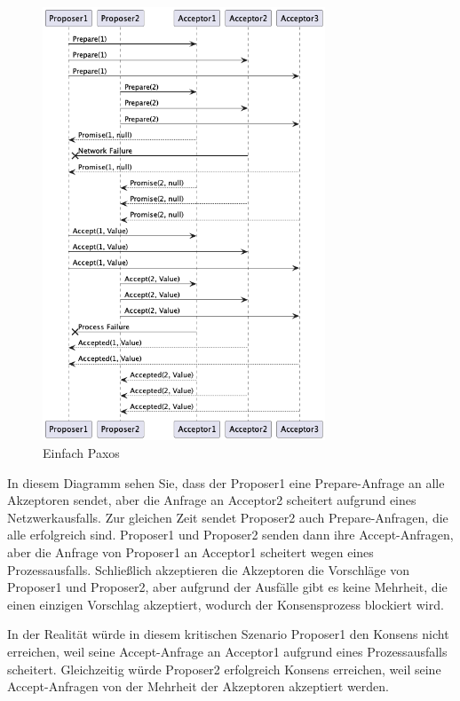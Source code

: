 \begin{figure}[!ht]
  \centering
  \includegraphics[width=0.75\textwidth]{fig/uml/paxos-issue}
  \caption{Einfach Paxos}
  \label{fig:simple-paxos-issue}
\end{figure}

In diesem Diagramm sehen Sie, dass der Proposer1 eine Prepare-Anfrage an alle Akzeptoren sendet, aber die Anfrage an Acceptor2 scheitert aufgrund eines Netzwerkausfalls. Zur gleichen Zeit sendet Proposer2 auch Prepare-Anfragen, die alle erfolgreich sind. Proposer1 und Proposer2 senden dann ihre Accept-Anfragen, aber die Anfrage von Proposer1 an Acceptor1 scheitert wegen eines Prozessausfalls. Schließlich akzeptieren die Akzeptoren die Vorschläge von Proposer1 und Proposer2, aber aufgrund der Ausfälle gibt es keine Mehrheit, die einen einzigen Vorschlag akzeptiert, wodurch der Konsensprozess blockiert wird.

In der Realität würde in diesem kritischen Szenario Proposer1 den Konsens nicht erreichen, weil seine Accept-Anfrage an Acceptor1 aufgrund eines Prozessausfalls scheitert. Gleichzeitig würde Proposer2 erfolgreich Konsens erreichen, weil seine Accept-Anfragen von der Mehrheit der Akzeptoren akzeptiert werden.

